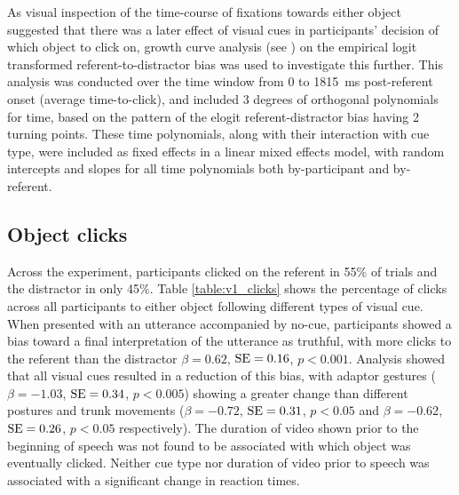 \documentclass[a4paper,man,natbib]{apa6}
\newcommand{\resultsLog}[3]{$\beta = #1$, $\textnormal{SE} = #2$, $p #3$}
\begin{document}
As visual inspection of the time-course of fixations towards either object suggested that there was a later effect of visual cues in participants' decision of which object to click on, growth curve analysis (see \citealt{Mirman2008}) on the empirical logit transformed referent-to-distractor bias was used to investigate this further. 
This analysis was conducted over the time window from 0 to 1815~ms post-referent onset (average time-to-click), and included 3 degrees of orthogonal polynomials for time, based on the pattern of the elogit referent-distractor bias having 2 turning points. 
These time polynomials, along with their interaction with cue type, were included as fixed effects in a linear mixed effects model, with random intercepts and slopes for all time polynomials both by-participant and by-referent.


\subsection{Object clicks} 
Across the experiment, participants clicked on the referent in 55\% of trials and the distractor in only 45\%.
Table \ref{table:v1_clicks} shows the percentage of clicks across all participants to either object following different types of visual cue.
When presented with an utterance accompanied by no-cue, participants showed a bias toward a final interpretation of the utterance as truthful, with more clicks to the referent than the distractor \resultsLog{0.62}{0.16}{<0.001}.
Analysis showed that all visual cues resulted in a reduction of this bias, with adaptor gestures (\resultsLog{-1.03}{0.34}{<0.005}) showing a greater change than different postures and trunk movements (\resultsLog{-0.72}{0.31}{<0.05} and \resultsLog{-0.62}{0.26}{<0.05} respectively). 
The duration of video shown prior to the beginning of speech was not found to be associated with which object was eventually clicked.
Neither cue type nor duration of video prior to speech was associated with a significant change in reaction times.
\end{document}
